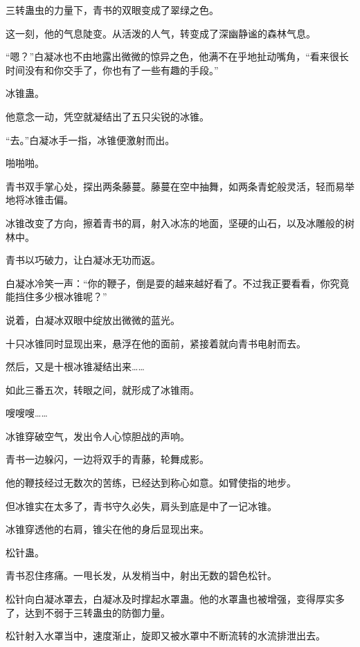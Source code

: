 
\begin{this_body}



三转蛊虫的力量下，青书的双眼变成了翠绿之色。

这一刻，他的气息陡变。从活泼的人气，转变成了深幽静谧的森林气息。

“嗯？”白凝冰也不由地露出微微的惊异之色，他满不在乎地扯动嘴角，“看来很长时间没有和你交手了，你也有了一些有趣的手段。”

冰锥蛊。

他意念一动，凭空就凝结出了五只尖锐的冰锥。

“去。”白凝冰手一指，冰锥便激射而出。

啪啪啪。

青书双手掌心处，探出两条藤蔓。藤蔓在空中抽舞，如两条青蛇般灵活，轻而易举地将冰锥击偏。

冰锥改变了方向，擦着青书的肩，射入冰冻的地面，坚硬的山石，以及冰雕般的树林中。

青书以巧破力，让白凝冰无功而返。

白凝冰冷笑一声：“你的鞭子，倒是耍的越来越好看了。不过我正要看看，你究竟能挡住多少根冰锥呢？”

说着，白凝冰双眼中绽放出微微的蓝光。

十只冰锥同时显现出来，悬浮在他的面前，紧接着就向青书电射而去。

然后，又是十根冰锥凝结出来……

如此三番五次，转眼之间，就形成了冰锥雨。

嗖嗖嗖……

冰锥穿破空气，发出令人心惊胆战的声响。

青书一边躲闪，一边将双手的青藤，轮舞成影。

他的鞭技经过无数次的苦练，已经达到称心如意。如臂使指的地步。

但冰锥实在太多了，青书守久必失，肩头到底是中了一记冰锥。

冰锥穿透他的右肩，锥尖在他的身后显现出来。

松针蛊。

青书忍住疼痛。一甩长发，从发梢当中，射出无数的碧色松针。

松针向白凝冰罩去，白凝冰及时撑起水罩蛊。他的水罩蛊也被增强，变得厚实多了，达到不弱于三转蛊虫的防御力量。

松针射入水罩当中，速度渐止，旋即又被水罩中不断流转的水流排泄出去。


\end{this_body}
